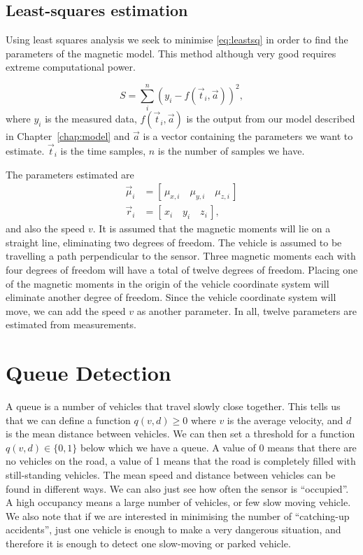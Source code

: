 \subsection{Least-squares estimation}\label{subsec:leastsq}
Using least squares analysis we seek to minimise \eqref{eq:leastsq} in order to find the parameters of the magnetic model. This method although very good requires extreme computational power.
 
\begin{equation}
	S = \sum_i^n \left(y_i - f(\vec{t}_i,\vec{a})\right)^2,\label{eq:leastsq}
\end{equation}
where $y_i$ is the measured data, $f(\vec{t}_i,\vec{a})$ is the output from our model described in Chapter~\ref{chap:model} and $\vec{a}$ is a vector containing the parameters we want to estimate. $\vec{t}_i$ is the time samples, $n$ is the number of samples we have.

The parameters estimated are
\begin{align}
	\vec{\mu}_i &= \left[\,\mu_{x,i}\quad{}\mu_{y,i}\quad{}\mu_{z,i}\,\right]\\
	\vec{r}_i &= \left[\,x_i\quad{}y_i\quad{}z_i\,\right],
\end{align}
and also the speed $v$. It is assumed that the magnetic moments will lie on a straight line, eliminating two degrees of freedom. The vehicle is assumed to be travelling a path perpendicular to the sensor. Three magnetic moments each with four degrees of freedom will have a total of twelve degrees of freedom. Placing one of the magnetic moments in the origin of the vehicle coordinate system will eliminate another degree of freedom. Since the vehicle coordinate system will move, we can add the speed $v$ as another parameter. In all, twelve parameters are estimated from measurements.

\section{Queue Detection}
A queue is a number of vehicles that travel slowly close together. This tells us that we can define a function $q(v,d) \geq 0$ where $v$ is the average velocity, and $d$ is the mean distance between vehicles. We can then set a threshold for a function $q(v,d) \in \{0,1\}$ below which we have a queue. A value of 0 means that there are no vehicles on the road, a value of 1 means that the road is completely filled with still-standing vehicles. The mean speed and distance between vehicles can be found in different ways. We can also just see how often the sensor is ``occupied''. A high occupancy means a large number of vehicles, or few slow moving vehicle. We also note that if we are interested in minimising the number of ``catching-up accidents'', just one vehicle is enough to make a very dangerous situation, and therefore it is enough to detect one slow-moving or parked vehicle.

